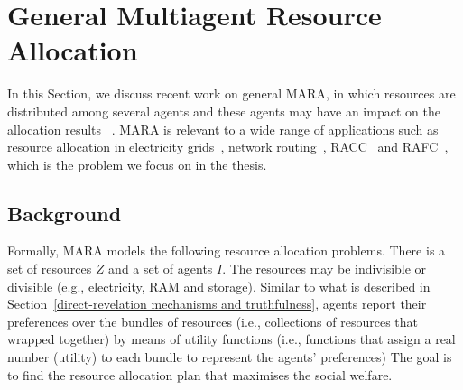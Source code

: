 \documentclass[11pt]{phdthesis}
\begin{document}
\section{General Multiagent Resource Allocation} \label{general multiagent resource allocation}
In this Section, we discuss recent work on general MARA, in which resources are distributed among several agents and these agents may have an impact on the allocation results ~\citep{chevaleyre2006issues}. MARA is relevant to a wide range of applications such as resource allocation in electricity grids~\citep{gradwell2005distributed}, network routing~\citep{feldmann2003selfish}, RACC~\citep{wang2017multiagent} and RAFC~\citep{yi2015survey}, which is the problem we focus on in the thesis. 

\subsection{Background} \label{multiagent resource allocation}

Formally, MARA models the following resource allocation problems. There is a set of resources $ Z $ and a set of agents $ I $. The resources may be indivisible or divisible (e.g., electricity, RAM and storage). Similar to what is described in Section~\ref{direct-revelation mechanisms and truthfulness}, agents report their preferences over the bundles of resources (i.e., collections of resources that wrapped together) by means of utility functions
(i.e., functions that assign a real number (utility) to each bundle to represent the  agents' preferences) 
The goal is to find the resource allocation plan that maximises the social welfare.
\end{document}
